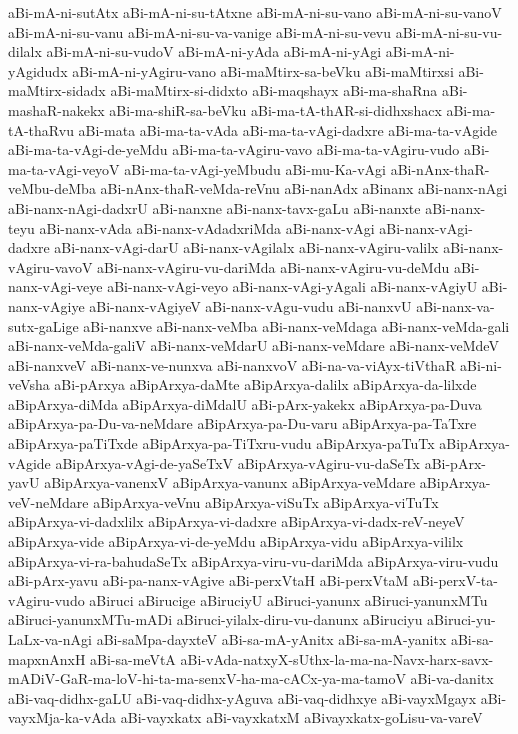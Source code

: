 {aBi-mA-ni-sutAtx
aBi-mA-ni-su-tAtxne
aBi-mA-ni-su-vano
aBi-mA-ni-su-vanoV
aBi-mA-ni-su-vanu
aBi-mA-ni-su-va-vanige
aBi-mA-ni-su-vevu
aBi-mA-ni-su-vu-dilalx
aBi-mA-ni-su-vudoV
aBi-mA-ni-yAda
aBi-mA-ni-yAgi
aBi-mA-ni-yAgidudx
aBi-mA-ni-yAgiru-vano
aBi-maMtirx-sa-beVku
aBi-maMtirxsi
aBi-maMtirx-sidadx
aBi-maMtirx-si-didxto
aBi-maqshayx
aBi-ma-shaRna
aBi-mashaR-nakekx
aBi-ma-shiR-sa-beVku
aBi-ma-tA-thAR-si-didhxshacx
aBi-ma-tA-thaRvu
aBi-mata
aBi-ma-ta-vAda
aBi-ma-ta-vAgi-dadxre
aBi-ma-ta-vAgide
aBi-ma-ta-vAgi-de-yeMdu
aBi-ma-ta-vAgiru-vavo
aBi-ma-ta-vAgiru-vudo
aBi-ma-ta-vAgi-veyoV
aBi-ma-ta-vAgi-yeMbudu
aBi-mu-Ka-vAgi
aBi-nAnx-thaR-veMbu-deMba
aBi-nAnx-thaR-veMda-reVnu
aBi-nanAdx
aBinanx
aBi-nanx-nAgi
aBi-nanx-nAgi-dadxrU
aBi-nanxne
aBi-nanx-tavx-gaLu
aBi-nanxte
aBi-nanx-teyu
aBi-nanx-vAda
aBi-nanx-vAdadxriMda
aBi-nanx-vAgi
aBi-nanx-vAgi-dadxre
aBi-nanx-vAgi-darU
aBi-nanx-vAgilalx
aBi-nanx-vAgiru-valilx
aBi-nanx-vAgiru-vavoV
aBi-nanx-vAgiru-vu-dariMda
aBi-nanx-vAgiru-vu-deMdu
aBi-nanx-vAgi-veye
aBi-nanx-vAgi-veyo
aBi-nanx-vAgi-yAgali
aBi-nanx-vAgiyU
aBi-nanx-vAgiye
aBi-nanx-vAgiyeV
aBi-nanx-vAgu-vudu
aBi-nanxvU
aBi-nanx-va-sutx-gaLige
aBi-nanxve
aBi-nanx-veMba
aBi-nanx-veMdaga
aBi-nanx-veMda-gali
aBi-nanx-veMda-galiV
aBi-nanx-veMdarU
aBi-nanx-veMdare
aBi-nanx-veMdeV
aBi-nanxveV
aBi-nanx-ve-nunxva
aBi-nanxvoV
aBi-na-va-viAyx-tiVthaR
aBi-ni-veVsha
aBi-pArxya
aBipArxya-daMte
aBipArxya-dalilx
aBipArxya-da-lilxde
aBipArxya-diMda
aBipArxya-diMdalU
aBi-pArx-yakekx
aBipArxya-pa-Duva
aBipArxya-pa-Du-va-neMdare
aBipArxya-pa-Du-varu
aBipArxya-pa-TaTxre
aBipArxya-paTiTxde
aBipArxya-pa-TiTxru-vudu
aBipArxya-paTuTx
aBipArxya-vAgide
aBipArxya-vAgi-de-yaSeTxV
aBipArxya-vAgiru-vu-daSeTx
aBi-pArx-yavU
aBipArxya-vanenxV
aBipArxya-vanunx
aBipArxya-veMdare
aBipArxya-veV-neMdare
aBipArxya-veVnu
aBipArxya-viSuTx
aBipArxya-viTuTx
aBipArxya-vi-dadxlilx
aBipArxya-vi-dadxre
aBipArxya-vi-dadx-reV-neyeV
aBipArxya-vide
aBipArxya-vi-de-yeMdu
aBipArxya-vidu
aBipArxya-vililx
aBipArxya-vi-ra-bahudaSeTx
aBipArxya-viru-vu-dariMda
aBipArxya-viru-vudu
aBi-pArx-yavu
aBi-pa-nanx-vAgive
aBi-perxVtaH
aBi-perxVtaM
aBi-perxV-ta-vAgiru-vudo
aBiruci
aBirucige
aBiruciyU
aBiruci-yanunx
aBiruci-yanunxMTu
aBiruci-yanunxMTu-mADi
aBiruci-yilalx-diru-vu-danunx
aBiruciyu
aBiruci-yu-LaLx-va-nAgi
aBi-saMpa-dayxteV
aBi-sa-mA-yAnitx
aBi-sa-mA-yanitx
aBi-sa-mapxnAnxH
aBi-sa-meVtA
aBi-vAda-natxyX-sUthx-la-ma-na-Navx-harx-savx-mADiV-GaR-ma-loV-hi-ta-ma-senxV-ha-ma-cACx-ya-ma-tamoV
aBi-va-danitx
aBi-vaq-didhx-gaLU
aBi-vaq-didhx-yAguva
aBi-vaq-didhxye
aBi-vayxMgayx
aBi-vayxMja-ka-vAda
aBi-vayxkatx
aBi-vayxkatxM
aBivayxkatx-goLisu-va-vareV
}
